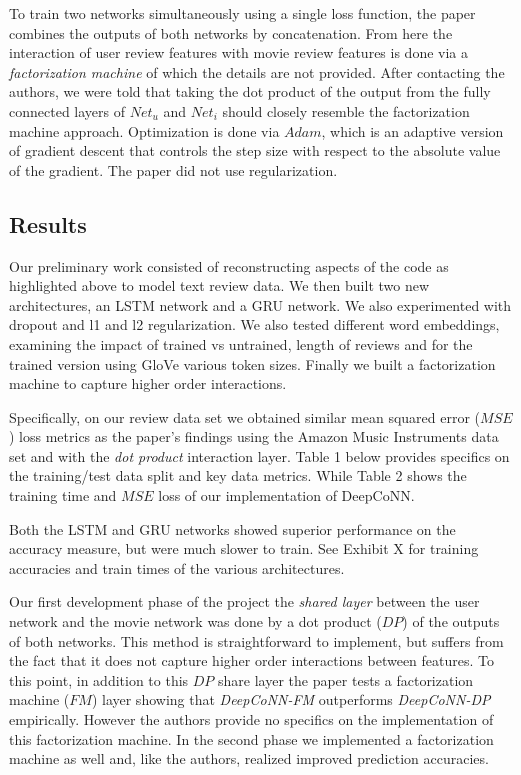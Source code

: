 \documentclass[10pt,twocolumn,letterpaper]{article}
\begin{document}
To train two networks simultaneously using a single loss function, the paper combines the outputs of both networks by concatenation. From here the interaction of user review features with movie review features is done via a \textit{factorization machine} of which the details are not provided. After contacting the authors, we were told that taking the dot product of the output from the fully connected layers of $Net_{u}$ and $Net_{i}$ should closely resemble the factorization machine approach. Optimization is done via $Adam$, which is an adaptive version of gradient descent that controls the step size with respect to the absolute value of the gradient. The paper did not use regularization.


\subsection{Results}

Our preliminary work consisted of reconstructing aspects of the code as highlighted above to model text review data.  We then built two new architectures, an LSTM network and a GRU network. We also experimented with dropout and l1 and l2 regularization. We also tested different word embeddings, examining the impact of trained vs untrained, length of reviews and for the trained version using GloVe various token sizes. Finally we built a factorization machine to capture higher order interactions. 

Specifically, on our review data set we obtained similar mean squared error ($MSE$) loss metrics as the paper's findings using the Amazon Music Instruments data set and with the \textit{dot product} interaction layer. Table 1 below provides specifics on the training/test data split and key data metrics. While Table 2 shows the training time and $MSE$ loss of our implementation of DeepCoNN.

Both the LSTM and GRU networks showed superior performance on the accuracy measure, but were much slower to train. See Exhibit X for training accuracies and train times of the various architectures. 

Our first development phase of the project the \textit{shared layer} between the user network and the movie network was done by a dot product ($DP$) of the outputs of both networks. This method is straightforward to implement, but suffers from the fact that it does not capture higher order interactions between features. To this point, in addition to this $DP$ share layer the paper tests a factorization machine ($FM$) layer showing that \textit{DeepCoNN-FM} outperforms \textit{DeepCoNN-DP} empirically. However the authors provide no specifics on the implementation of this factorization machine. In the second phase we implemented a factorization machine as well and, like the authors, realized improved prediction accuracies. 
\end{document}
